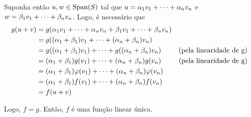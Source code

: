 \documentclass[11pt,reqno,a4paper]{amsart}
\begin{document}
Suponha então $u,w \in \mathrm{Span}(S)$ tal que $u = \comblin$ e $w = \comblin[\beta]$. Logo, é necessário que
\begin{align*}
    g(u+v) &= g(\comblin + \comblin[\beta])\\
    &= g((\alpha_1 + \beta_1) v_1 + \dots + (\alpha_n + \beta_n) v_n)\\
    &= g((\alpha_1 + \beta_1) v_1) + \dots + g((\alpha_n + \beta_n) v_n) &\text{(pela linearidade de g)}\\
    &= (\alpha_1 + \beta_1) g(v_1) + \dots + (\alpha_n + \beta_n) g(v_n) &\text{(pela linearidade de g)}\\
    &= (\alpha_1 + \beta_1) \varphi (v_1) + \dots + (\alpha_n + \beta_n) \varphi (v_n)\\
    &= (\alpha_1 + \beta_1) f(v_1) + \dots + (\alpha_n + \beta_n) f(v_n)\\
    &= f(u + v)
\end{align*}

Logo, $f = g$. Então, $f$ é uma função linear única.



\endgroup
\end{document}
